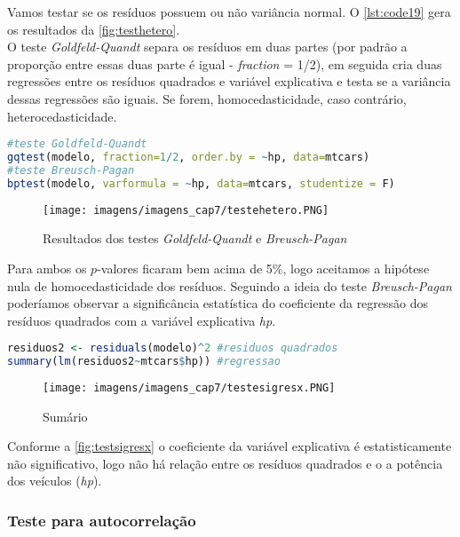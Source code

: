 \noindent Vamos testar se os resíduos possuem ou não variância normal. O \autoref{lst:code19} gera os resultados da \autoref{fig:testhetero}.\\

\noindent O teste \textit{Goldfeld-Quandt} separa os resíduos em duas partes (por padrão a proporção entre essas duas parte é igual - \textit{fraction} = 1/2), em seguida cria duas regressões entre os resíduos quadrados e variável explicativa e testa se a variância dessas regressões são iguais. Se forem, homocedasticidade, caso contrário, heterocedasticidade.

\begin{lstlisting}[language=R, caption = {Testes \textit{Goldfeld-Quandt} e \textit{Breusch-Pagan}},label={lst:code19}]
#teste Goldfeld-Quandt
gqtest(modelo, fraction=1/2, order.by = ~hp, data=mtcars)
#teste Breusch-Pagan
bptest(modelo, varformula = ~hp, data=mtcars, studentize = F)
\end{lstlisting}

\begin{figure}[H]
\centering
\caption{Resultados dos testes \textit{Goldfeld-Quandt} e \textit{Breusch-Pagan}}
\texttt{[image: imagens/imagens\_cap7/testehetero.PNG]}
\label{fig:testhetero}
\end{figure}

\noindent Para ambos os $p$-valores ficaram bem acima de 5\%, logo aceitamos a hipótese nula de homocedasticidade dos resíduos. Seguindo a ideia do teste \textit{Breusch-Pagan} poderíamos observar a significância estatística do coeficiente da regressão dos resíduos quadrados com a variável explicativa \textit{hp}.

\begin{lstlisting}[language=R, caption = {Testes de heterocedasticidade},label={lst:code20}]
residuos2 <- residuals(modelo)^2 #residuos quadrados
summary(lm(residuos2~mtcars$hp)) #regressao
\end{lstlisting}

\begin{figure}[H]
\centering
\caption{Sumário}
\texttt{[image: imagens/imagens\_cap7/testesigresx.PNG]}
\label{fig:testsigresx}
\end{figure}

\noindent Conforme a \autoref{fig:testsigresx} o coeficiente da variável explicativa é estatisticamente não significativo, logo não há relação entre os resíduos quadrados e o a potência dos veículos (\textit{hp}).

\subsubsection{Teste para autocorrelação}

